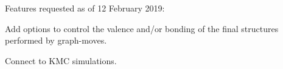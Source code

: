 Features requested as of 12 February 2019\+:


\begin{DoxyItemize}
\item Add options to control the valence and/or bonding of the final structures performed by graph-\/moves.
\item Connect to K\+MC simulations. 
\end{DoxyItemize}